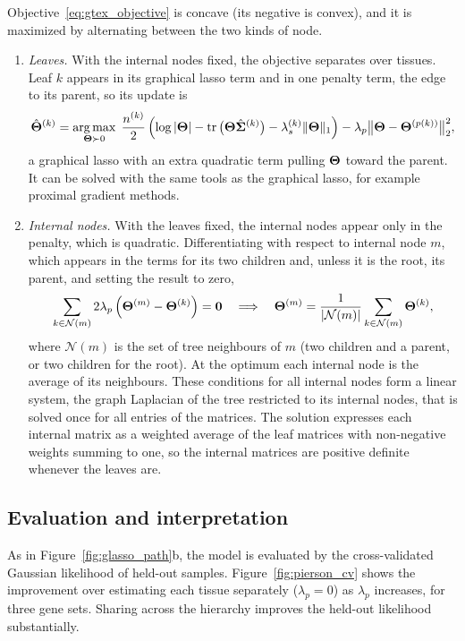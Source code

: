 Objective~\eqref{eq:gtex_objective} is concave (its negative is convex), and it is maximized by alternating between the two kinds of node.
\begin{enumerate}
  \item \emph{Leaves.} With the internal nodes fixed, the objective separates over tissues. Leaf $k$ appears in its graphical lasso term and in one penalty term, the edge to its parent, so its update is
  \begin{equation}
    \hat{\boldsymbol{\Theta}}^{(k)} = \operatorname*{arg\,max}_{\boldsymbol{\Theta}\succ0}\;\frac{n^{(k)}}{2}\left(\log|\boldsymbol{\Theta}|-\operatorname{tr}\big(\boldsymbol{\Theta}\hat{\boldsymbol{\Sigma}}^{(k)}\big)-\lambda_s^{(k)}\|\boldsymbol{\Theta}\|_1\right) - \lambda_p\big\|\boldsymbol{\Theta}-\boldsymbol{\Theta}^{(p(k))}\big\|_2^2,
  \end{equation}
  a graphical lasso with an extra quadratic term pulling $\boldsymbol{\Theta}$ toward the parent. It can be solved with the same tools as the graphical lasso, for example proximal gradient methods.
  \item \emph{Internal nodes.} With the leaves fixed, the internal nodes appear only in the penalty, which is quadratic. Differentiating with respect to internal node $m$, which appears in the terms for its two children and, unless it is the root, its parent, and setting the result to zero,
  \begin{equation}
    \sum_{k\in\mathcal{N}(m)}2\lambda_p\left(\boldsymbol{\Theta}^{(m)}-\boldsymbol{\Theta}^{(k)}\right)=\mathbf{0}
    \quad\Longrightarrow\quad
    \boldsymbol{\Theta}^{(m)} = \frac{1}{|\mathcal{N}(m)|}\sum_{k\in\mathcal{N}(m)}\boldsymbol{\Theta}^{(k)},
  \end{equation}
  where $\mathcal{N}(m)$ is the set of tree neighbours of $m$ (two children and a parent, or two children for the root). At the optimum each internal node is the average of its neighbours. These conditions for all internal nodes form a linear system, the graph Laplacian of the tree restricted to its internal nodes, that is solved once for all entries of the matrices. The solution expresses each internal matrix as a weighted average of the leaf matrices with non-negative weights summing to one, so the internal matrices are positive definite whenever the leaves are.
\end{enumerate}

\subsection{Evaluation and interpretation}

As in Figure~\ref{fig:glasso_path}b, the model is evaluated by the cross-validated Gaussian likelihood of held-out samples. Figure~\ref{fig:pierson_cv} shows the improvement over estimating each tissue separately ($\lambda_p=0$) as $\lambda_p$ increases, for three gene sets. Sharing across the hierarchy improves the held-out likelihood substantially.

